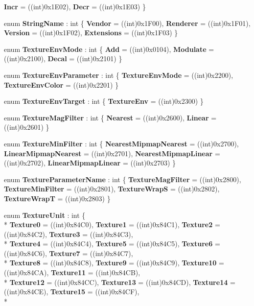 \begin{DoxyCompactItemize}
{\bfseries Incr} = ((int)0x1\-E02), 
{\bfseries Decr} = ((int)0x1\-E03)
 \}
\item 
enum {\bfseries String\-Name} \-: int \{ {\bfseries Vendor} = ((int)0x1\-F00), 
{\bfseries Renderer} = ((int)0x1\-F01), 
{\bfseries Version} = ((int)0x1\-F02), 
{\bfseries Extensions} = ((int)0x1\-F03)
 \}
\item 
enum {\bfseries Texture\-Env\-Mode} \-: int \{ {\bfseries Add} = ((int)0x0104), 
{\bfseries Modulate} = ((int)0x2100), 
{\bfseries Decal} = ((int)0x2101)
 \}
\item 
enum {\bfseries Texture\-Env\-Parameter} \-: int \{ {\bfseries Texture\-Env\-Mode} = ((int)0x2200), 
{\bfseries Texture\-Env\-Color} = ((int)0x2201)
 \}
\item 
enum {\bfseries Texture\-Env\-Target} \-: int \{ {\bfseries Texture\-Env} = ((int)0x2300)
 \}
\item 
enum {\bfseries Texture\-Mag\-Filter} \-: int \{ {\bfseries Nearest} = ((int)0x2600), 
{\bfseries Linear} = ((int)0x2601)
 \}
\item 
enum {\bfseries Texture\-Min\-Filter} \-: int \{ {\bfseries Nearest\-Mipmap\-Nearest} = ((int)0x2700), 
{\bfseries Linear\-Mipmap\-Nearest} = ((int)0x2701), 
{\bfseries Nearest\-Mipmap\-Linear} = ((int)0x2702), 
{\bfseries Linear\-Mipmap\-Linear} = ((int)0x2703)
 \}
\item 
enum {\bfseries Texture\-Parameter\-Name} \-: int \{ {\bfseries Texture\-Mag\-Filter} = ((int)0x2800), 
{\bfseries Texture\-Min\-Filter} = ((int)0x2801), 
{\bfseries Texture\-Wrap\-S} = ((int)0x2802), 
{\bfseries Texture\-Wrap\-T} = ((int)0x2803)
 \}
\item 
enum {\bfseries Texture\-Unit} \-: int \{ \\*
{\bfseries Texture0} = ((int)0x84\-C0), 
{\bfseries Texture1} = ((int)0x84\-C1), 
{\bfseries Texture2} = ((int)0x84\-C2), 
{\bfseries Texture3} = ((int)0x84\-C3), 
\\*
{\bfseries Texture4} = ((int)0x84\-C4), 
{\bfseries Texture5} = ((int)0x84\-C5), 
{\bfseries Texture6} = ((int)0x84\-C6), 
{\bfseries Texture7} = ((int)0x84\-C7), 
\\*
{\bfseries Texture8} = ((int)0x84\-C8), 
{\bfseries Texture9} = ((int)0x84\-C9), 
{\bfseries Texture10} = ((int)0x84\-C\-A), 
{\bfseries Texture11} = ((int)0x84\-C\-B), 
\\*
{\bfseries Texture12} = ((int)0x84\-C\-C), 
{\bfseries Texture13} = ((int)0x84\-C\-D), 
{\bfseries Texture14} = ((int)0x84\-C\-E), 
{\bfseries Texture15} = ((int)0x84\-C\-F), 
\\*

\end{DoxyCompactItemize}

